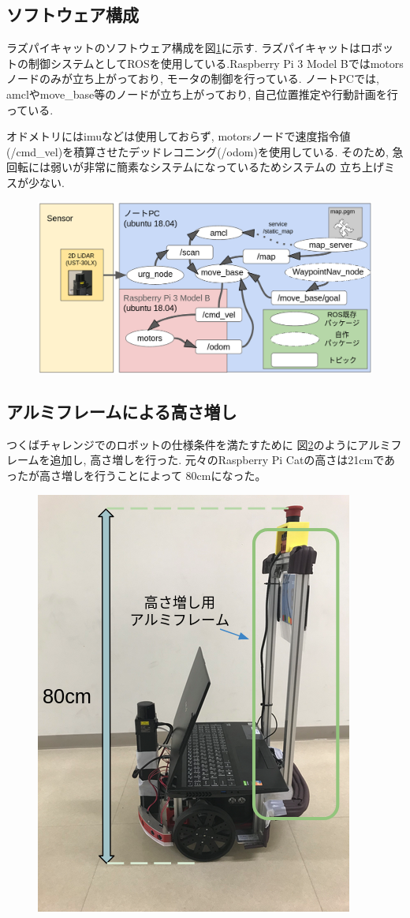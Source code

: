 \subsection{ソフトウェア構成}
ラズパイキャットのソフトウェア構成を図\ref{fig:raspicat-software-config}に示す.
ラズパイキャットはロボットの制御システムとしてROSを使用している.Raspberry Pi 3 Model Bではmotorsノードのみが立ち上がっており, 
モータの制御を行っている. 
ノートPCでは, amclやmove\_base等のノードが立ち上がっており, 
自己位置推定や行動計画を行っている.

オドメトリにはimuなどは使用しておらず, 
motorsノードで速度指令値(/cmd\_vel)を積算させたデッドレコニング(/odom)を使用している. 
そのため, 急回転には弱いが非常に簡素なシステムになっているためシステムの
立ち上げミスが少ない.



\begin{figure}[H]
	\begin{center}
		\includegraphics[width=0.9\linewidth]{figs/raspicat-software-config.png}
		\caption{}
		\label{fig:raspicat-software-config}
	\end{center}
\end{figure}

\subsection{アルミフレームによる高さ増し}
つくばチャレンジでのロボットの仕様条件を満たすために
図\ref{fig:raspicat-alumiframe}のようにアルミフレームを追加し, 高さ増しを行った.
元々のRaspberry Pi Catの高さは21cmであったが高さ増しを行うことによって
80cmになった。

\begin{figure}[H]
	\begin{center}
		\includegraphics[width=0.5\linewidth]{figs/raspicat-alumiframe.png}
		\caption{}
		\label{fig:raspicat-alumiframe}
	\end{center}
\end{figure}